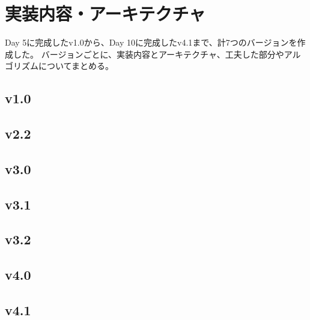 \documentclass[dvipdfmx,10pt,a4paper,titlepage]{jsarticle}
\begin{document}
    \section{実装内容・アーキテクチャ}
    Day 5に完成したv1.0から、Day 10に完成したv4.1まで、計7つのバージョンを作成した。
    バージョンごとに、実装内容とアーキテクチャ、工夫した部分やアルゴリズムについてまとめる。
    \subsection{v1.0}
    \subsection{v2.2}
    \subsection{v3.0}
    \subsection{v3.1}
    \subsection{v3.2}
    \subsection{v4.0}
    \subsection{v4.1}
    
\end{document}
